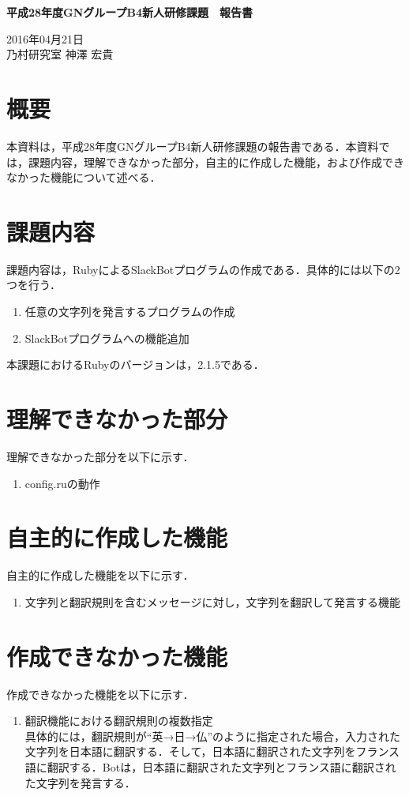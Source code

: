 \documentclass[fleqn, 14pt]{sty/extarticlej}
\begin{document}
\begin{center}
{\Large {\bf 平成28年度GNグループB4新人研修課題　報告書}}

\end{center}
\begin{flushright}
2016年04月21日\\

乃村研究室 神澤 宏貴
\end{flushright}
\section{概要}
本資料は，平成28年度GNグループB4新人研修課題の報告書である．本資料では，課題内容，理解できなかった部分，自主的に作成した機能，および作成できなかった機能について述べる．

\section{課題内容}
課題内容は，RubyによるSlackBotプログラムの作成である．具体的には以下の2つを行う．
\begin{enumerate}
\item 任意の文字列を発言するプログラムの作成
\item SlackBotプログラムへの機能追加
\end{enumerate}
本課題におけるRubyのバージョンは，2.1.5である．

\section{理解できなかった部分}
理解できなかった部分を以下に示す．
\begin{enumerate}
\item config.ruの動作
\end{enumerate}
\section{自主的に作成した機能}
自主的に作成した機能を以下に示す．
\begin{enumerate}
\item 文字列と翻訳規則を含むメッセージに対し，文字列を翻訳して発言する機能
\end{enumerate}
\section{作成できなかった機能}
作成できなかった機能を以下に示す．
\begin{enumerate}
\item 翻訳機能における翻訳規則の複数指定\\
  具体的には，翻訳規則が``英→日→仏''のように指定された場合，入力された文字列を日本語に翻訳する．そして，日本語に翻訳された文字列をフランス語に翻訳する．Botは，日本語に翻訳された文字列とフランス語に翻訳された文字列を発言する．
\end{enumerate}
  
\end{document}
